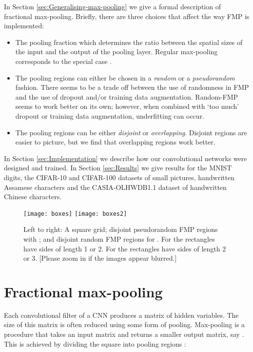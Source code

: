 \documentclass[english]{article}
\begin{document}
In Section \ref{sec:Generalising-max-pooling} we give a formal description
of fractional max-pooling. Briefly, there are three choices that affect
the way FMP is implemented:
\begin{itemize}
\item The pooling fraction  which determines the ratio between
the spatial sizes of the input and the output of the pooling layer.
Regular  max-pooling corresponds to the special case .
\item The pooling regions can either be chosen in a \emph{random} or a \emph{pseudorandom}
fashion. There seems to be a trade off between the use of randomness
in FMP and the use of dropout and/or training data augmentation.
Random-FMP seems to work better on its own; however, when combined with `too much' dropout or training data augmentation,
underfitting can occur.
\item The pooling regions can be either \emph{disjoint} or \emph{overlapping}.
Disjoint regions are easier to picture, but we find that overlapping
regions work better.
\end{itemize}
In Section \ref{sec:Implementation} we describe how our convolutional
networks were designed and trained. In Section \ref{sec:Results}
we give results for the MNIST digits, the CIFAR-10 and CIFAR-100 datasets
of small pictures, handwritten Assamese characters and the CASIA-OLHWDB1.1
dataset of handwritten Chinese characters.

\begin{figure}
\begin{centering}
\texttt{[image: boxes]}
\texttt{[image: boxes2]}
\par\end{centering}

\caption{Left to right: A  square grid; disjoint pseudorandom
FMP regions with \mbox{};
and disjoint random FMP regions for . For 
the rectangles have sides of length 1 or 2. For 
the rectangles have sides of length 2 or 3. [Please zoom in if the images appear blurred.]\label{fig:pool}}
\end{figure}



\section{Fractional max-pooling\label{sec:Generalising-max-pooling}}

Each convolutional filter of a CNN produces a matrix of hidden variables.
The size of this matrix is often reduced using some form of pooling.
Max-pooling is a procedure that takes an 
input matrix and returns a smaller output matrix, say .
This is achieved by dividing the 
square into  pooling regions :
\end{document}
